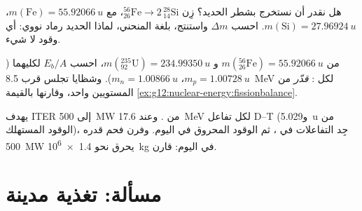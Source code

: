 \begin{exercise}[$\star\star\star$]\label{exo:g12:nuclear-energy:13}
هل نقدر أن نستخرج  بشطر الحديد؟ زِن
${}^{56}_{26}\mathrm{Fe} \to 2\,{}^{28}_{14}\mathrm{Si}$، مع
$m(\mathrm{Fe}) = \qty{55.92066}{u}$، $m(\mathrm{Si}) = \qty{27.96924}{u}$.
احسب $\Delta m$ واستنتج، بلغة المنحني، لماذا الحديد رماد
نووي: أي وقود لا شيء.
\end{exercise}

\begin{exercise}[$\star\star\star$]\label{exo:g12:nuclear-energy:14}
من $m({}^{56}_{26}\mathrm{Fe}) = \qty{55.92066}{u}$ و
$m({}^{235}_{92}\mathrm{U}) = \qty{234.99350}{u}$، احسب $E_b/A$ لكليهما
($m_p = \qty{1.00728}{u}$، $m_n = \qty{1.00866}{u}$). وشظايا  تجلس
قرب \qty{8.5}{MeV} لكل : \emph{قدّر} من المستويين 
 واحد، وقارنها بالقيمة \cref{ex:g12:nuclear-energy:fissionbalance}.
\end{exercise}

\begin{exercise}[$\star\star\star$]\label{exo:g12:nuclear-energy:15}
يهدف ITER إلى \qty{500}{MW} من  . وعند \qty{17.6}{MeV} لكل تفاعل
D--T (و\qty{5.029}{u} من الوقود المستهلك)، جِد التفاعلات في ،
ثم الوقود المحروق في اليوم. وفرن فحم قدره \qty{500}{MW} يحرق نحو
\qty{1.4e6}{kg} في اليوم: قارن.
\end{exercise}

\section{مسألة: تغذية مدينة}

